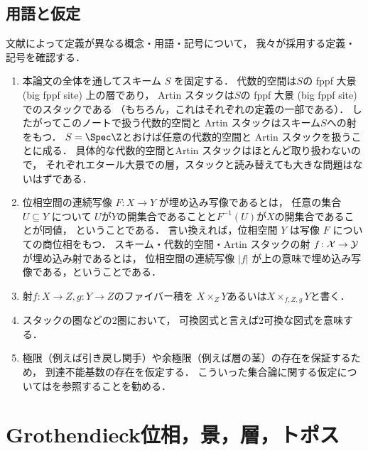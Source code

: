 \subsection{用語と仮定} \label{ssec:term_conv}
    文献によって定義が異なる概念・用語・記号について，
    我々が採用する定義・記号を確認する．
    \begin{enumerate}
        \item
            本論文の全体を通してスキーム $S$ を固定する．
            代数的空間は$S$の fppf 大景 (big fppf site) 上の層であり，
            Artin スタックは$S$の fppf 大景 (big fppf site) でのスタックである
            （もちろん，これはそれぞれの定義の一部である）．
            したがってこのノートで扱う代数的空間と Artin スタックはスキーム$S$への射をもつ．
            $S=\Spec \Z$とおけば任意の代数的空間と Artin スタックを扱うことに成る．
            具体的な代数的空間とArtin スタックはほとんど取り扱わないので，
            それぞれエタール大景での層，スタックと読み替えても大きな問題はないはずである．
        
        \item
            位相空間の連続写像 $F \colon X \to Y$ が埋め込み写像であるとは，
            任意の集合 $U \subseteq Y$ について
            $U$が$Y$の開集合であることと$F^{-1}(U)$が$X$の開集合であることが同値，
            ということである．
            言い換えれば，位相空間 $Y$ は写像 $F$ についての商位相をもつ．
            スキーム・代数的空間・Artin スタックの射 $f \colon \mathcal{X} \to \mathcal{Y}$ が埋め込み射であるとは，
            位相空間の連続写像 $|f|$ が上の意味で埋め込み写像である，ということである．

        \item
            射$f \colon X \to Z, g \colon Y \to Z$のファイバー積を
            $X \times_{Z} Y$あるいは$X \times_{f,Z,g} Y$と書く．

        \item
            スタックの圏などの$2$圏において，
            可換図式と言えば$2$可換な図式を意味する．

        \item
            極限（例えば引き戻し関手）や余極限（例えば層の茎）の存在を保証するため，
            到達不能基数の存在を仮定する．
            こういった集合論に関する仮定については\cite{Shulman08}を参照することを勧める．
    \end{enumerate}

\section{Grothendieck位相，景，層，トポス}
